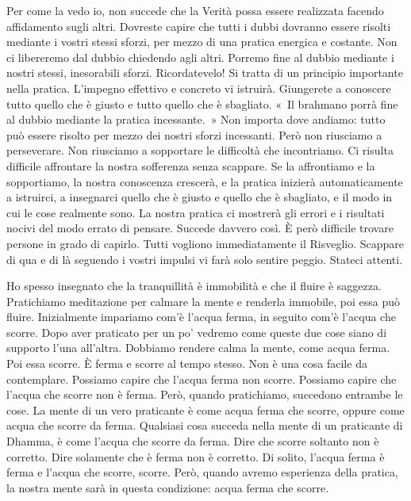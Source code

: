 Per come la vedo io, non succede che la Verità possa essere realizzata
facendo affidamento sugli altri. Dovreste capire che tutti i dubbi
dovranno essere risolti mediante i vostri stessi sforzi, per mezzo di
una pratica energica e costante. Non ci libereremo dal dubbio chiedendo
agli altri. Porremo fine al dubbio mediante i nostri stessi, inesorabili
sforzi. Ricordatevelo! Si tratta di un principio importante nella
pratica. L'impegno effettivo e concreto vi istruirà. Giungerete a
conoscere tutto quello che è giusto e tutto quello che è sbagliato. «~Il
brahmano porrà fine al dubbio mediante la pratica incessante.~» Non
importa dove andiamo: tutto può essere risolto per mezzo dei nostri
sforzi incessanti. Però non riusciamo a perseverare. Non riusciamo a
sopportare le difficoltà che incontriamo. Ci risulta difficile
affrontare la nostra sofferenza senza scappare. Se la affrontiamo e la
sopportiamo, la nostra conoscenza crescerà, e la pratica inizierà
automaticamente a istruirci, a insegnarci quello che è giusto e quello
che è sbagliato, e il modo in cui le cose realmente sono. La nostra
pratica ci mostrerà gli errori e i risultati nocivi del modo errato di
pensare. Succede davvero così. È però difficile trovare persone in grado
di capirlo. Tutti vogliono immediatamente il Risveglio. Scappare di qua
e di là seguendo i vostri impulsi vi farà solo sentire peggio. Stateci
attenti.

Ho spesso insegnato che la tranquillità è immobilità e che il fluire è
saggezza. Pratichiamo meditazione per calmare la mente e renderla
immobile, poi essa può fluire. Inizialmente impariamo com'è l'acqua
ferma, in seguito com'è l'acqua che scorre. Dopo aver praticato per un
po' vedremo come queste due cose siano di supporto l'una all'altra.
Dobbiamo rendere calma la mente, come acqua ferma. Poi essa scorre. È
ferma e scorre al tempo stesso. Non è una cosa facile da contemplare.
Possiamo capire che l'acqua ferma non scorre. Possiamo capire che
l'acqua che scorre non è ferma. Però, quando pratichiamo, succedono
entrambe le cose. La mente di un vero praticante è come acqua ferma che
scorre, oppure come acqua che scorre da ferma. Qualsiasi cosa succeda
nella mente di un praticante di Dhamma, è come l'acqua che scorre da
ferma. Dire che scorre soltanto non è corretto. Dire solamente che è
ferma non è corretto. Di solito, l'acqua ferma è ferma e l'acqua che
scorre, scorre. Però, quando avremo esperienza della pratica, la nostra
mente sarà in questa condizione: acqua ferma che scorre.

